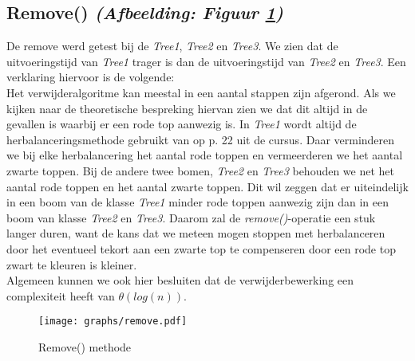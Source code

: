 \documentclass[11pt,a4paper]{report}
\begin{document}
\subsection{Remove() \textsl{(Afbeelding: Figuur \ref{remove})}}
De remove werd getest bij de \textsl{Tree1}, \textsl{Tree2} en \textsl{Tree3}. We zien dat de uitvoeringstijd van \textsl{Tree1} trager is dan de uitvoeringstijd van \textsl{Tree2} en \textsl{Tree3}. Een verklaring hiervoor is de volgende:\\
Het verwijderalgoritme kan meestal in een aantal stappen zijn afgerond. Als we kijken naar de theoretische bespreking hiervan zien we dat dit altijd in de gevallen is waarbij er een rode top aanwezig is. In \textsl{Tree1} wordt altijd de herbalanceringsmethode gebruikt van op p. 22 uit de cursus. Daar verminderen we bij elke herbalancering het aantal rode toppen en vermeerderen we het aantal zwarte toppen. Bij de andere twee bomen, \textsl{Tree2} en \textsl{Tree3} behouden we net het aantal rode toppen en het aantal zwarte toppen. Dit wil zeggen dat er uiteindelijk in een boom van de klasse \textsl{Tree1} minder rode toppen aanwezig zijn dan in een boom van klasse \textsl{Tree2} en \textsl{Tree3}. Daarom zal de \textsl{remove()}-operatie een stuk langer duren, want de kans dat we meteen mogen stoppen met herbalanceren door het eventueel tekort aan een zwarte top te compenseren door een rode top zwart te kleuren is kleiner.\\
Algemeen kunnen we ook hier besluiten dat de verwijderbewerking een complexiteit heeft van $\theta(log(n))$.
\begin{figure}[h!]
	\texttt{[image: graphs/remove.pdf]}
	\caption{Remove() methode}
	\label{remove}
\end{figure}
\end{document}
